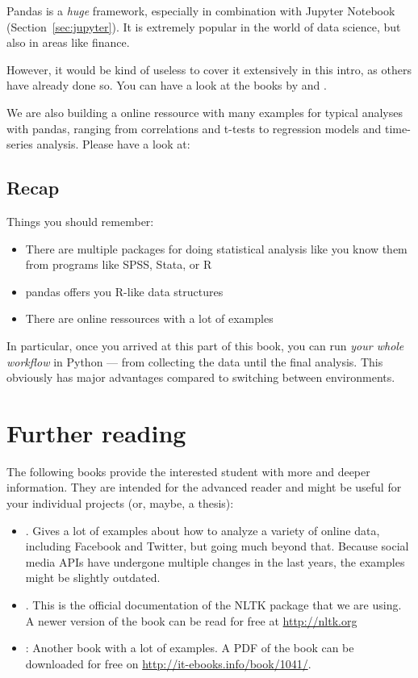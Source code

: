 \documentclass[a4paper,12pt]{book}
\begin{document}
Pandas is a \emph{huge} framework, especially in combination with Jupyter Notebook (Section~\ref{sec:jupyter}). It is extremely popular in the world of data science, but also in areas like finance. 

However, it would be kind of useless to cover it extensively in this intro, as others have already done so. You can have a look at the books by \cite{McKinney2012} and  \cite{Russel2013}. 

We are also building a online ressource with many examples for typical analyses with pandas, ranging from correlations and t-tests to regression models and time-series analysis. Please have a look at:



\section{Recap}
Things you should remember:
\begin{itemize}
	\item There are multiple packages for doing statistical analysis like you know them from programs like SPSS, Stata, or R
	\item pandas offers you R-like data structures
	\item There are online ressources with a lot of examples
\end{itemize}
In particular, once you arrived at this part of this book, you can run \emph{your whole workflow} in Python --- from collecting the data until the final analysis. This obviously has major advantages compared to switching between environments.


\chapter{Further reading}
The following books provide the interested student with more and deeper information. They are intended for the advanced reader and might be useful for your individual projects (or, maybe, a thesis):

\begin{itemize}
\item \citealp{Russel2013}. Gives a lot of examples about how to analyze a variety of online data, including Facebook and Twitter, but going much beyond that. Because social media APIs have undergone multiple changes in the last years, the examples might be slightly outdated.
\item \citealp{Bird2009}. This is the official documentation of the NLTK package that we are using. A newer version of the book can be read for free at \url{http://nltk.org}
\item \citealp{McKinney2012}: Another book with a lot of examples. A PDF of the book can be downloaded for free on \url{http://it-ebooks.info/book/1041/}.
\end{itemize}
\end{document}
